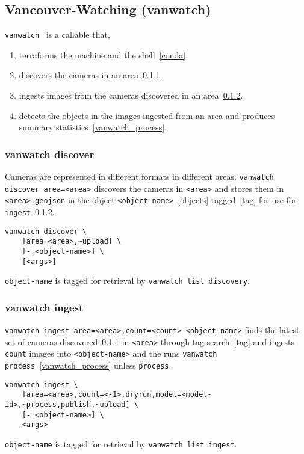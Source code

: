 \subsection{Vancouver-Watching (vanwatch)}
\label{vanwatch}

\texttt{vanwatch}~ is a callable that,
%
\begin{enumerate}
    \item{terraforms the machine and the shell~\ref{conda}.}
    \item{discovers the cameras in an area~\ref{vanwatch_discover}.}
    \item{ingests images from the cameras discovered in an area~\ref{vanwatch_ingest}.}
    \item{detects the objects in the images ingested from an area and produces summary statistics~\ref{vanwatch_process}.}
\end{enumerate}

\subsubsection{vanwatch discover}
\label{vanwatch_discover}

Cameras are represented in different formats in different areas. \texttt{vanwatch discover area=<area>} discovers the cameras in \texttt{<area>} and stores them in \texttt{<area>.geojson} in the object \texttt{<object-name>}~\ref{objects} tagged~\ref{tag} for use for \texttt{ingest}~\ref{vanwatch_ingest}.
%
\begin{verbatim}
vanwatch discover \
    [area=<area>,~upload] \
    [-|<object-name>] \
    [<args>]
\end{verbatim}
%
\texttt{object-name} is tagged for retrieval by \texttt{vanwatch list discovery}. 

\subsubsection{vanwatch ingest}
\label{vanwatch_ingest}

\texttt{vanwatch ingest area=<area>,count=<count> <object-name>} finds the latest set of cameras discovered~\ref{vanwatch_discover} in \texttt{<area>} through tag search~\ref{tag} and ingests \texttt{count} images into \texttt{<object-name>} and the runs \texttt{vanwatch process}~\ref{vanwatch_process} unless \texttt{\~process}.
%
\begin{verbatim}
vanwatch ingest \
    [area=<area>,count=<-1>,dryrun,model=<model-id>,~process,publish,~upload] \
    [-|<object-name>] \
    <args>
\end{verbatim}
%
\texttt{object-name} is tagged for retrieval by \texttt{vanwatch list ingest}. 

